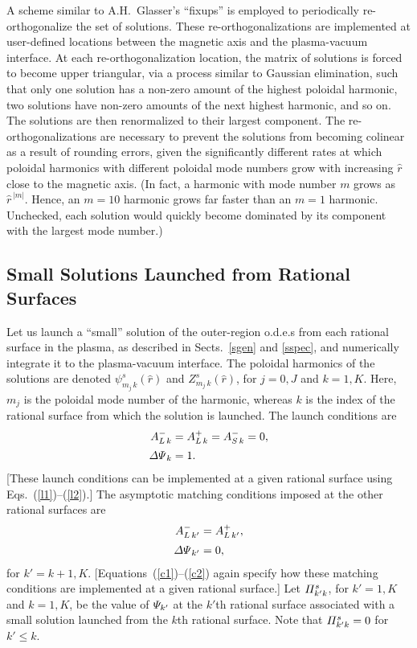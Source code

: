 \documentclass[12pt,prb,aps]{revtex4-1}
\begin{document}
A scheme similar to A.H.~Glasser's ``fixups'' \cite{ham} is employed to periodically re-orthogonalize the set of solutions. These  re-orthogonalizations are implemented at user-defined locations between the magnetic axis and the plasma-vacuum interface.  At each re-orthogonalization location, the matrix of solutions is forced to become upper triangular, via a process similar to Gaussian elimination, such that only one solution has a non-zero amount of the highest poloidal  harmonic, two solutions have non-zero amounts of the next highest harmonic, and so on. The solutions are then renormalized to their largest component. 
 The re-orthogonalizations are
 necessary to prevent the solutions from becoming colinear as a result of rounding errors, given the significantly
 different rates at which poloidal harmonics with different poloidal mode numbers grow with increasing $\hat{r}$  close to the magnetic axis. (In fact, a
 harmonic with mode number $m$ grows as $\hat{r}^{\,|m|}$. Hence, an $m=10$ harmonic  grows far faster than an $m=1$ harmonic. Unchecked, each solution
 would quickly become dominated by its component with the largest mode number.)

\subsection{Small Solutions Launched from Rational Surfaces}\label{smalll}
Let us launch a ``small'' solution of the outer-region o.d.e.s  from each rational surface in the plasma, as described in Sects.~\ref{sgen} and \ref{sspec}, 
 and numerically integrate it to the plasma-vacuum interface. The poloidal harmonics of
the solutions are denoted $\psi^s_{m_{j}\,k}(\hat{r})$ and $Z^s_{m_{j}\,k}(\hat{r})$, for $j=0,J$ and $k=1,K$. Here,
$m_{j}$ is the poloidal mode number of the harmonic, whereas $k$ is the index of the rational surface from which the solution is launched.
The launch conditions are
\begin{align}
A_{L\,k}^- &= A_{L\,k}^+ = A_{S\,k}^- = 0,\\[0.5ex]
{\mit\Delta\Psi}_k &=1.
\end{align}
[These launch conditions can be implemented at a given rational surface using Eqs.~(\ref{l1})--(\ref{l2}).]
The asymptotic matching conditions imposed at the other rational surfaces are
\begin{align}
A_{L\,k'}^{-} &= A_{L\,k'}^+,\\[0.5ex]
{\mit\Delta\Psi}_{k'} &= 0,
\end{align}
for $k'=k+1,K$. [Equations~(\ref{c1})--(\ref{c2}) again specify how these matching conditions are implemented at a given rational surface.]
Let 
${\mit\Pi}_{k'k}^s$, for $k'=1,K$ and $k=1,K$,  be the value of ${\mit\Psi}_{k'}$ at the $k'$th rational surface associated with a small solution
launched from the $k$th rational surface. Note that ${\mit\Pi}_{k'k}^s=0$ for $k' \leq k$.  
\end{document}
